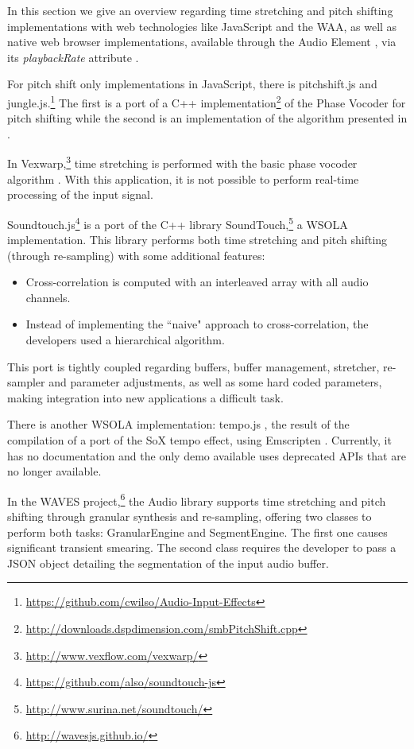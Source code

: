 \documentclass{sig-alternate}
\begin{document}
\begin{sloppypar}
In this section we give an overview regarding time stretching and pitch shifting implementations with web technologies like JavaScript and the WAA, as well as native web browser implementations, available through the Audio Element \cite{audiotag}, via its \textit{playbackRate} attribute \cite{audiotag:playbackRate}.

For pitch shift only implementations in JavaScript, there is pitchshift.js \cite{kievII} and jungle.js.\footnote{\url{https://github.com/cwilso/Audio-Input-Effects}} The first is a port of a C++ implementation\footnote{\url{http://downloads.dspdimension.com/smbPitchShift.cpp}} of the Phase Vocoder for pitch shifting \cite{phasevocoder:pitchshift} while the second is an implementation of the algorithm presented in \cite{modulationline:pitchshift}. 

In Vexwarp,\footnote{\url{http://www.vexflow.com/vexwarp/}} time stretching is performed with the basic phase vocoder algorithm \cite{dolsontutorial:phasevocoder}. With this application, it is not possible to perform real-time processing of the input signal.

Soundtouch.js\footnote{\url{https://github.com/also/soundtouch-js}} is a port of the C++ library SoundTouch,\footnote{\url{http://www.surina.net/soundtouch/}} a WSOLA implementation. This library performs both time stretching and pitch shifting (through re-sampling) with some additional features: 
\begin{itemize}
	\item Cross-correlation is computed with an interleaved array with all audio channels.
	\item Instead of implementing the ``naive" approach to cross-correlation, the developers used a hierarchical algorithm.
\end{itemize}

This port is tightly coupled regarding buffers, buffer management, stretcher, re-sampler and parameter adjustments, as well as some hard coded parameters, making integration into new applications a difficult task.

There is another WSOLA implementation: tempo.js \cite{kievII}, the result of the compilation of a port of the SoX tempo effect, using Emscripten \cite{emscripten}. Currently, it has no documentation and the only demo available uses deprecated APIs that are no longer available.

In the WAVES project,\footnote{\url{http://wavesjs.github.io/}} the Audio library \cite{wavesaudio:wac2015} supports time stretching and pitch shifting through granular synthesis and re-sampling, offering two classes to perform both tasks: GranularEngine and SegmentEngine. The first one causes significant transient smearing. The second class requires the developer to pass a JSON object detailing the segmentation of the input audio buffer.


\end{sloppypar}
\end{document}
